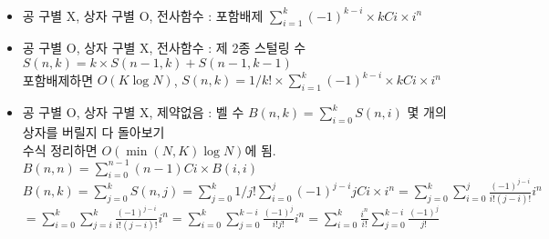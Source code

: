 \documentclass[landscape, 8pt, a4paper, oneside, twocolumn]{extarticle}
\begin{document}
{}{}{}{}{}
\begin{itemize}
\setlength\itemsep{0.1em}

\item 공 구별 X, 상자 구별 O, 전사함수 : 포함배제 $\sum_{i=1}^{k} (-1)^{k-i} \times kCi \times i^n$
\item 공 구별 O, 상자 구별 X, 전사함수 : 제 2종 스털링 수 $S(n,k)=k\times S(n-1,k) + S(n-1, k-1)$\\
포함배제하면 $O(K \log N)$, $S(n,k) = 1/k! \times \sum_{i=1}^{k} (-1)^{k-i} \times kCi \times i^n$
\item 공 구별 O, 상자 구별 X, 제약없음 : 벨 수 $B(n,k) = \sum_{i=0}^{k} S(n,i)$ 몇 개의 상자를 버릴지 다 돌아보기\\
수식 정리하면 $O(\min(N,K)\log N)$에 됨. $B(n,n) = \sum_{i=0}^{n-1} (n-1)Ci \times B(i,i)$\\
$B(n,k)=\sum_{j=0}^{k}S(n,j) = \sum_{j=0}^{k} 1/j! \sum_{i=0}^{j} (-1)^{j-i} jCi \times i^n=\sum_{j=0}^{k}\sum_{i=0}^{j} \frac{(-1)^{j-i}}{i!(j-i)!}i^n$\\
$=\sum_{i=0}^{k}\sum_{j=i}^{k}\frac{(-1)^{j-i}}{i!(j-i)!}i^n = \sum_{i=0}^{k}\sum_{j=0}^{k-i}\frac{(-1)^j}{i!j!}i^n = \sum_{i=0}^k \frac{i^n}{i!}\sum_{j=0}^{k-i} \frac{(-1)^j}{j!}$



\end{itemize}
\end{document}
